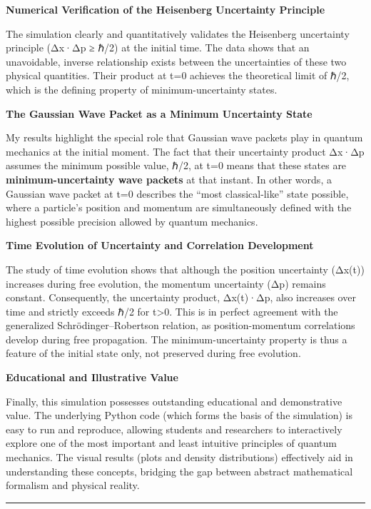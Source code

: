 \documentclass[
]{article}
\begin{document}
\textbf{Numerical Verification of the Heisenberg Uncertainty Principle}

The simulation clearly and quantitatively validates the Heisenberg
uncertainty principle (Δx·Δp ≥ ℏ/2) at the initial time. The data shows
that an unavoidable, inverse relationship exists between the
uncertainties of these two physical quantities. Their product at t=0
achieves the theoretical limit of ℏ/2, which is the defining property of
minimum-uncertainty states.

\textbf{The Gaussian Wave Packet as a Minimum Uncertainty State}

My results highlight the special role that Gaussian wave packets play in
quantum mechanics at the initial moment. The fact that their uncertainty
product Δx·Δp assumes the minimum possible value, ℏ/2, at t=0 means that
these states are \textbf{minimum-uncertainty wave packets} at that
instant. In other words, a Gaussian wave packet at t=0 describes the
``most classical-like'' state possible, where a particle's position and
momentum are simultaneously defined with the highest possible precision
allowed by quantum mechanics.

\textbf{Time Evolution of Uncertainty and Correlation Development}

The study of time evolution shows that although the position uncertainty
(Δx(t)) increases during free evolution, the momentum uncertainty (Δp)
remains constant. Consequently, the uncertainty product, Δx(t)·Δp, also
increases over time and strictly exceeds ℏ/2 for t\textgreater0. This is
in perfect agreement with the generalized Schrödinger--Robertson
relation, as position-momentum correlations develop during free
propagation. The minimum-uncertainty property is thus a feature of the
initial state only, not preserved during free evolution.

\textbf{Educational and Illustrative Value}

Finally, this simulation possesses outstanding educational and
demonstrative value. The underlying Python code (which forms the basis
of the simulation) is easy to run and reproduce, allowing students and
researchers to interactively explore one of the most important and least
intuitive principles of quantum mechanics. The visual results (plots and
density distributions) effectively aid in understanding these concepts,
bridging the gap between abstract mathematical formalism and physical
reality.

\begin{center}\rule{0.5\linewidth}{0.5pt}\end{center}
\end{document}
